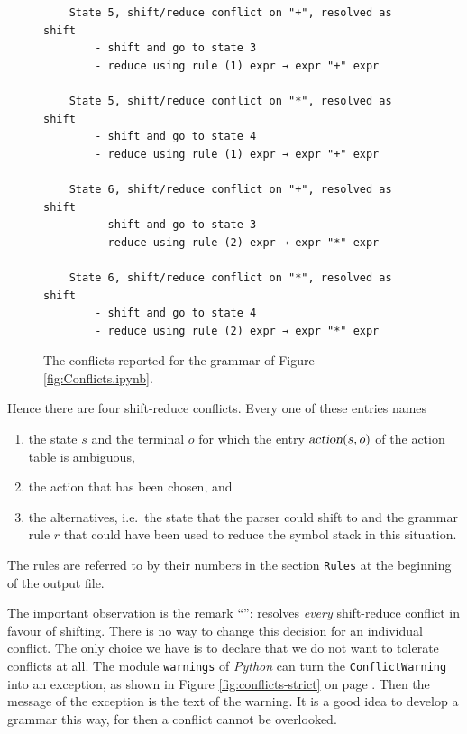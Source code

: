 \begin{figure}[!ht]
\centering
\begin{verbatim}
    State 5, shift/reduce conflict on "+", resolved as shift
        - shift and go to state 3
        - reduce using rule (1) expr → expr "+" expr

    State 5, shift/reduce conflict on "*", resolved as shift
        - shift and go to state 4
        - reduce using rule (1) expr → expr "+" expr

    State 6, shift/reduce conflict on "+", resolved as shift
        - shift and go to state 3
        - reduce using rule (2) expr → expr "*" expr

    State 6, shift/reduce conflict on "*", resolved as shift
        - shift and go to state 4
        - reduce using rule (2) expr → expr "*" expr
\end{verbatim}
\vspace*{-0.3cm}
\caption{The conflicts reported for the grammar of Figure \ref{fig:Conflicts.ipynb}.}
\label{fig:Conflicts.warnings}
\end{figure}
\FloatBarrier

\noindent
Hence there are four shift-reduce conflicts.  Every one of these entries names
\begin{enumerate}
\item the state $s$ and the terminal $o$ for which the entry $\textsl{action}(s,o)$ of the action table is
      ambiguous,
\item the action that has been chosen, and
\item the alternatives, i.e.~the state that the parser could shift to and the grammar rule $r$ that could have
      been used to reduce the symbol stack in this situation.
\end{enumerate}
The rules are referred to by their numbers in the section \texttt{Rules} at the beginning of the output file.

The important observation is the remark ``'':  resolves
\emph{every} shift-reduce conflict in favour of shifting.  There is no way to change this decision for an
individual conflict.  The only choice we have is to declare that we do not want to tolerate conflicts at all.
The module \texttt{warnings} of \textsl{Python} can turn the \texttt{ConflictWarning} into an exception, as
shown in Figure \ref{fig:conflicts-strict} on page \pageref{fig:conflicts-strict}.  Then the message of the
exception is the text of the warning.  It is a good idea to develop a grammar this way, for then a conflict
cannot be overlooked.

